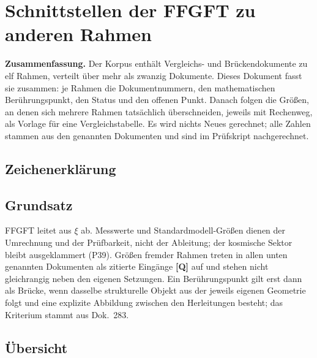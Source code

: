 \providecommand{\BM}{\textbf{[B]}}
\providecommand{\KM}{\textbf{[K]}}
\providecommand{\SM}{\textbf{[S]}}
\providecommand{\XM}{\textbf{[X]}}
\providecommand{\QM}{\textbf{[Q]}}

\chapter*{Schnittstellen der FFGFT zu anderen Rahmen}

{\small\noindent\textbf{Zusammenfassung.}\quad\ignorespaces
Der Korpus enthält Vergleichs- und Brückendokumente zu elf Rahmen, verteilt
über mehr als zwanzig Dokumente. Dieses Dokument fasst sie zusammen: je Rahmen
die Dokumentnummern, den mathematischen Berührungspunkt, den Status und den
offenen Punkt. Danach folgen die Größen, an denen sich mehrere Rahmen
tatsächlich überschneiden, jeweils mit Rechenweg, als Vorlage für eine
Vergleichstabelle. Es wird nichts Neues gerechnet; alle Zahlen stammen aus den
genannten Dokumenten und sind im Prüfskript nachgerechnet.
}\medskip

\section*{Zeichenerklärung}

\medskip


\section{Grundsatz}

FFGFT leitet aus $\xi$ ab. Messwerte und Standardmodell-Größen dienen der
Umrechnung und der Prüfbarkeit, nicht der Ableitung; der kosmische Sektor
bleibt ausgeklammert (P39). Größen fremder Rahmen treten in allen unten
genannten Dokumenten als zitierte Eingänge \QM{} auf und stehen nicht
gleichrangig neben den eigenen Setzungen. Ein Berührungspunkt gilt erst dann
als Brücke, wenn dasselbe strukturelle Objekt aus der jeweils eigenen
Geometrie folgt und eine explizite Abbildung zwischen den Herleitungen
besteht; das Kriterium stammt aus Dok.~283.

\section{Übersicht}

